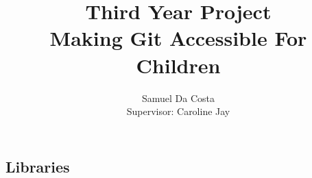 \documentclass[a4paper]{report}
\begin{document}
\newcommand{\commit}[0]{\texttt{commit}}
\newcommand{\fig}[4]{

\begin{figure} 
    \centering
    \texttt{[image: \#1]}
    \caption{#2}
    \label{#3}
\end{figure}


}

\title{Third Year Project \\
\large Making Git Accessible For Children \\
}
\author{Samuel Da Costa\\
Supervisor: Caroline Jay}
\maketitle
\tableofcontents







\begin{appendices}

\chapter{Libraries}\label{appendix_libraries}



\end{appendices}



\end{document}
